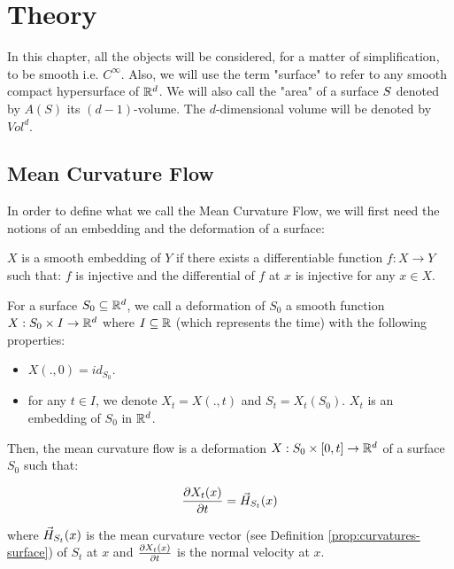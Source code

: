 \chapter{Theory}
\label{chapter:theory}

In this chapter, all the objects will be considered, for a matter of
simplification, to be smooth i.e. $ C^\infty $. Also, we will use the term
"surface" to refer to any smooth compact hypersurface of $ \mathbb{R}^d $. We will also
call the "area" of a surface $ S $ denoted by $ A(S) $ its $ (d-1)
$-volume. The $d$-dimensional volume will be denoted by $ Vol^d $.

\section{Mean Curvature Flow}

In order to define what we call the Mean Curvature Flow, we will
first need the notions of an embedding and the deformation of a surface:

\begin{definition}
    $ X $ is a smooth embedding of $ Y $ if there exists a differentiable
    function $ f : X \to Y $ such that: $ f $ is injective and the differential
    of $ f $ at $ x $ is injective for any $ x \in X $.
\end{definition}

\begin{definition}
    For a surface $ S_0 \subseteq \mathbb{R}^d $, we call a deformation of $ S_0 $ a
    smooth function $ X : S_0 \times I \to \mathbb{R}^d $ where $ I \subseteq \mathbb{R} $
    (which represents the time) with the following properties:
    \begin{itemize}
        \item $ X(., 0) = id_{S_0} $.
        \item for any $ t \in I $, we denote $ X_t = X(., t) $ and $ S_t =
            X_t(S_0) $. $ X_t $ is an embedding of $ S_0 $ in $ \mathbb{R}^d $.
    \end{itemize}
\end{definition}

Then, the mean curvature flow is a deformation $ X : S_0 \times [0, t] \to \mathbb{R}^d
$ of a surface $ S_0 $ such that:

\begin{equation}
    \frac{\partial{X_t(x)}}{\partial{t}} = \vec{H}_{S_t}(x)
\end{equation}

where $ \vec{H}_{S_t}(x) $ is the mean curvature vector (see Definition
\ref{prop:curvatures-surface}) of $ S_t $ at $ x $ and $ \frac{\partial{X_t(x)}}{\partial{t}} $
is the normal velocity at $ x $.

